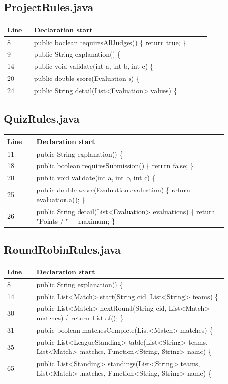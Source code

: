 \subsection*{ProjectRules.java}
\begin{longtable}{p{0.12\linewidth}p{0.78\linewidth}}\toprule Line & Declaration start\\\midrule\endhead
8 & public boolean requiresAllJudges() \{ return true; \}\\
9 & public String explanation() \{\\
14 & public void validate(int a, int b, int c) \{\\
20 & public double score(Evaluation e) \{\\
24 & public String detail(List<Evaluation> values) \{\\
\bottomrule\end{longtable}
\subsection*{QuizRules.java}
\begin{longtable}{p{0.12\linewidth}p{0.78\linewidth}}\toprule Line & Declaration start\\\midrule\endhead
11 & public String explanation() \{\\
18 & public boolean requiresSubmission() \{ return false; \}\\
20 & public void validate(int a, int b, int c) \{\\
25 & public double score(Evaluation evaluation) \{ return evaluation.a(); \}\\
26 & public String detail(List<Evaluation> evaluations) \{ return "Points / " + maximum; \}\\
\bottomrule\end{longtable}
\subsection*{RoundRobinRules.java}
\begin{longtable}{p{0.12\linewidth}p{0.78\linewidth}}\toprule Line & Declaration start\\\midrule\endhead
8 & public String explanation() \{\\
14 & public List<Match> start(String cid, List<String> teams) \{\\
30 & public List<Match> nextRound(String cid, List<Match> matches) \{ return List.of(); \}\\
31 & public boolean matchesComplete(List<Match> matches) \{\\
35 & public List<LeagueStanding> table(List<String> teams, List<Match> matches, Function<String, String> name) \{\\
65 & public List<Standing> standings(List<String> teams, List<Match> matches, Function<String, String> name) \{\\
\bottomrule\end{longtable}
